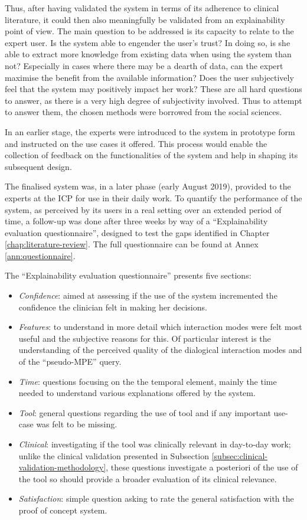 Thus, after having validated the system in terms of its adherence to clinical literature, it could then also meaningfully be validated from an explainability point of view.
The main question to be addressed is its capacity to relate to the expert user.
Is the system able to engender the user's trust?
In doing so, is she able to extract more knowledge from existing data when using the system than not?
Especially in cases where there may be a dearth of data, can the expert maximise the benefit from the available information?
Does the user subjectively feel that the system may positively impact her work?
These are all hard questions to answer, as there is a very high degree of subjectivity involved.
Thus to attempt to answer them, the chosen methods were borrowed from the social sciences.

In an earlier stage, the experts were introduced to the system in prototype form and instructed on the use cases it offered.
This process would enable the collection of feedback on the functionalities of the system and help in shaping its subsequent design.

The finalised system was, in a later phase (early August 2019), provided to the experts at the ICP for use in their daily work.
To quantify the performance of the system, as perceived by its users in a real setting over an extended period of time, a follow-up was done after three weeks by way of a \enquote{Explainability evaluation questionnaire}, designed to test the gaps identified in Chapter \ref{chap:literature-review}.
The full questionnaire can be found at Annex \ref{ann:questionnaire}.

The \enquote{Explainability evaluation questionnaire} presents five sections:
\begin{itemize}
  \item \textit{Confidence}: aimed at assessing if the use of the system incremented the confidence the clinician felt in making her decisions.
  \item \textit{Features}: to understand in more detail which interaction modes were felt most useful and the subjective reasons for this.
  Of particular interest is the understanding of the perceived quality of the dialogical interaction modes and of the \enquote{pseudo-MPE} query.
  \item \textit{Time}: questions focusing on the the temporal element, mainly the time needed to understand various explanations offered by the system.
  \item \textit{Tool}: general questions regarding the use of tool and if any important use-case was felt to be missing.
  \item \textit{Clinical}: investigating if the tool was clinically relevant in day-to-day work; unlike the clinical validation presented in Subsection \ref{subsec:clinical-validation-methodology}, these questions investigate a posteriori of the use of the tool so should provide a broader evaluation of its clinical relevance.
  \item \textit{Satisfaction}: simple question asking to rate the general satisfaction with the proof of concept system.
\end{itemize}

